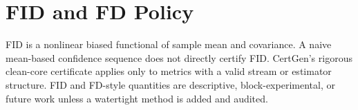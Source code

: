 \section{FID and FD Policy}

FID is a nonlinear biased functional of sample mean and covariance. A naive mean-based confidence sequence does not directly certify FID. CertGen's rigorous clean-core certificate applies only to metrics with a valid stream or estimator structure. FID and FD-style quantities are descriptive, block-experimental, or future work unless a watertight method is added and audited.
